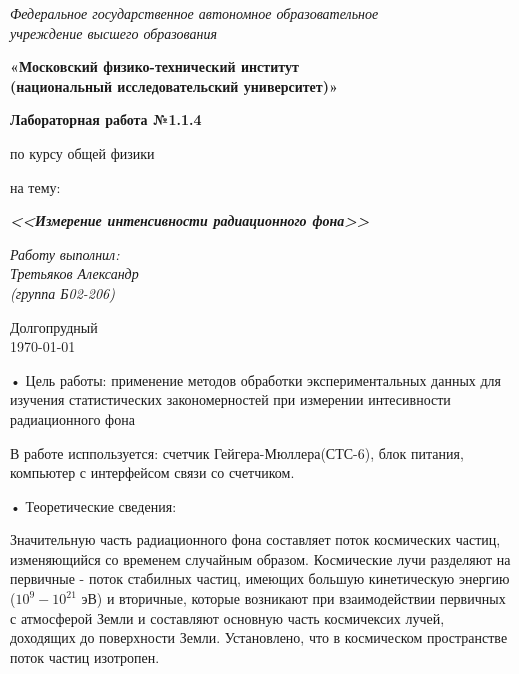 


	\begin{center}
		\textit{Федеральное государственное автономное образовательное\\ учреждение высшего образования }
		
		\vspace{0.5ex}
		
		\textbf{«Московский физико-технический институт\\ (национальный исследовательский университет)»}
	\end{center}
	
	\vspace{10ex}
	
	
	\begin{center}
		\vspace{13ex}
		
		\textbf{Лабораторная работа №1.1.4}
		
		\vspace{1ex}
		
		по курсу общей физики
		
		на тему:
		
		\textbf{\textit{<<Измерение интенсивности радиационного фона>>}}
		
		\vspace{30ex}
		
		\begin{flushright}
			\noindent
			\textit{Работу выполнил:}\\  
			\textit{Третьяков Александр \\(группа Б02-206)}
		\end{flushright}
		\vfill
		Долгопрудный \\ \today
		
	\end{center}
	\newpage	
	
	
	
	• Цель работы: применение методов обработки экспериментальных данных для изучения статистических закономерностей при измерении интесивности радиационного фона
	
	
	В работе исппользуется: счетчик  Гейгера-Мюллера(СТС-6), блок питания, компьютер с интерфейсом связи со счетчиком.
	\newline
	
	• Теоретические сведения:
	\newline
	
	Значительную часть радиационного фона составляет поток космических частиц, изменяющийся со временем случайным образом.
	Космические лучи разделяют на первичные - поток стабилных частиц, имеющих большую кинетическую энергию ($10^{9} - 10^{21}$ эВ) и вторичные, которые возникают при взаимодействии первичных с атмосферой Земли и составляют основную часть космичексих лучей, доходящих до поверхности Земли.
	Установлено, что в космическом пространстве поток частиц изотропен.
	\newline
	
